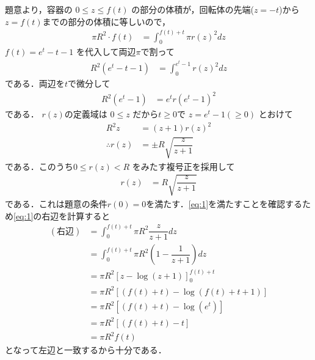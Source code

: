 \documentclass[../../main.tex]{subfiles}
\begin{document}
題意より，容器の $0 \le z \le f(t)$ の部分の体積が，回転体の先端($z=-t$)から$z=f(t)$までの部分の体積に等しいので，
\begin{align}
  \pi R^2 \cdot f(t) &= \int_0^{f(t)+t} \pi r(z)^2 dz \label{eq:1}
\end{align}
$f(t) = e^t - t - 1$ を代入して両辺$\pi$で割って
\begin{align}
  R^2 \left(e^t - t - 1\right) &= \int_0^{e^{t}-1} r(z)^2 dz
\end{align}
である．両辺を$t$で微分して
\begin{align}
  R^2(e^t - 1) &= e^t r(e^t - 1)^2 \label{eq:2}
\end{align}
である．
$r(z)$の定義域は $0 \le z$ だから$t\ge 0$で
$z = e^t - 1 (\ge 0)$ とおけて
\begin{align}
  R^2 z &= (z+1) r(z)^2 \\
  \therefore
  r(z) &= \pm R \sqrt{\dfrac{z}{z+1}} \label{eq:3}
\end{align}
である．このうち$0 \le r(z) < R$ をみたす複号正を採用して
\begin{align}
  r(z) &= R \sqrt{\dfrac{z}{z+1}}
\end{align}
である．これは題意の条件$r(0)=0$を満たす．\cref{eq:1}を満たすことを確認するため\cref{eq:1}の右辺を計算すると
\begin{align}
  (\text{右辺})
  &= \int_0^{f(t)+t} \pi R^2 \dfrac{z}{z+1} dz \\
  &= \int_0^{f(t)+t} \pi R^2 \left(1-\dfrac{1}{z+1}\right) dz \\
  &= \pi R^2 \left[z - \log (z+1)\right]_{0}^{f(t)+t} \\
  &= \pi R^2 \left[(f(t)+t)-\log(f(t)+t+1)\right] \\
  &= \pi R^2 \left[(f(t)+t)-\log(e^t)\right] \\
  &= \pi R^2 \left[(f(t)+t)-t \right] \\
  &= \pi R^2 f(t)
\end{align}
となって左辺と一致するから十分である．
\end{document}
